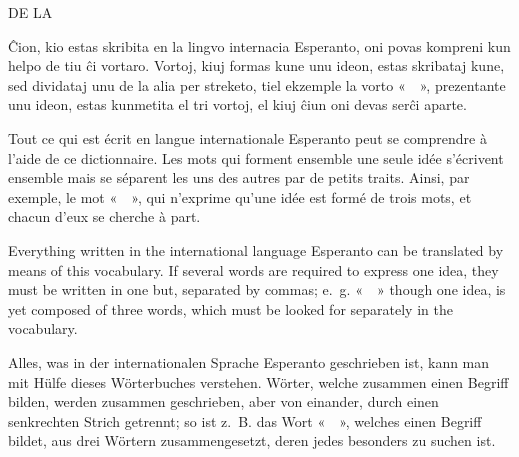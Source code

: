 %
%
\label{vortaro}
\thispagestyle{plain}
\vspace*{\fill}
\begin{center}

\vspace{1em}

{\small DE LA}
\vspace{1em}

\vspace{2em}

{\fontsize{30}{36}\selectfont{}}
\end{center}
\vspace*{\fill}
\newpage

\footnotesize

Ĉion, kio estas skribita en la lingvo internacia Esperanto, oni povas kompreni kun helpo de tiu ĉi vortaro. Vortoj, kiuj formas kune unu ideon, estas skribataj kune, sed dividataj unu de la alia per streketo, tiel ekzemple la vorto «~~», prezentante unu ideon, estas kunmetita el tri vortoj, el kiuj ĉiun oni devas serĉi aparte.

\flatsmallrule{}

Tout ce qui est écrit en langue internationale Esperanto peut se comprendre à l’aide de ce dictionnaire. Les mots qui forment ensemble une seule idée s’écrivent ensemble mais se séparent les uns des autres par de petits traits. Ainsi, par exemple, le mot «~~», qui n’exprime qu’une idée est formé de trois mots, et chacun d’eux se cherche à part.

\flatsmallrule{}

Everything written in the international language Esperanto can be translated by means of this vocabulary. If several words are required to express one idea, they must be written in one but, separated by commas; e.~g. «~~» though one idea, is yet composed of three words, which must be looked for separately in the vocabulary.

\flatsmallrule{}

Alles, was in der internationalen Sprache Esperanto geschrieben ist, kann man mit Hülfe dieses Wörterbuches verstehen. Wörter, welche zusammen einen Begriff bilden, werden zusammen geschrieben, aber von einander, durch einen senkrechten Strich getrennt; so ist z.~B. das Wort «~~», welches einen Begriff bildet, aus drei Wörtern zusammengesetzt, deren jedes besonders zu suchen ist.

